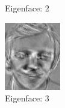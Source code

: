 \documentclass[12pt]{article}
\begin{document}
\begin{figure}
\begin{subfigure}[b]{0.20\textwidth}
		\caption{Eigenface: 2}
	\end{subfigure}\quad
	\begin{subfigure}[b]{0.20\textwidth}
		\includegraphics[width=\textwidth]{Task4.3_Images/PrincipalComponent3.jpg}
		\caption{Eigenface: 3}
	\end{subfigure}\\
	\begin{subfigure}[b]{0.20\textwidth}

\end{subfigure}
\end{figure}
\end{document}

